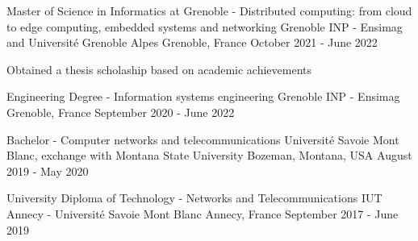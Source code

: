 

\begin{cventries}

\cventry
{Master of Science in Informatics at Grenoble - Distributed computing: from cloud to edge computing, embedded systems and networking} %
{Grenoble INP - Ensimag and Université Grenoble Alpes} %
{Grenoble, France} %
{October 2021 - June 2022} %
{
  \begin{cvitems}
    \item Obtained a thesis scholaship based on academic achievements
  \end{cvitems}
}

\cventry
{Engineering Degree - Information systems engineering} %
{Grenoble INP - Ensimag} %
{Grenoble, France} %
{September 2020 - June 2022} %
{
}

\cventry
{Bachelor - Computer networks and telecommunications} %
{Université Savoie Mont Blanc, exchange with Montana State University} %
{Bozeman, Montana, USA} %
{August 2019 - May 2020} %
{
}

\cventry
{University Diploma of Technology - Networks and Telecommunications} %
{IUT Annecy - Université Savoie Mont Blanc} %
{Annecy, France} %
{September 2017 - June 2019} %
{
}






\end{cventries}

